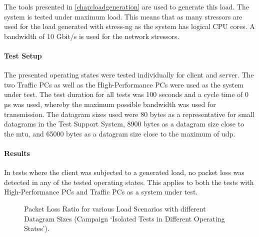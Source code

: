 The tools presented in \ref{chap:loadgeneration} are used to generate this load. The system is tested under maximum load. This means that as many stressors are used for the load generated with stress-ng as the system has logical \ac{CPU} cores. A bandwidth of 10 Gbit/s is used for the network stressors.

\paragraph{Test Setup}
The presented operating states were tested individually for client and server. The two Traffic PCs as well as the High-Performance PCs were used as the system under test. The test duration for all tests was 100 seconds and a cycle time of 0 µs was used, whereby the maximum possible bandwidth was used for transmission. The datagram sizes used were 80 bytes as a representative for small datagrams in the Test Support System, 8900 bytes as a datagram size close to the \ac{mtu}, and 65000 bytes as a datagram size close to the maximum of \ac{udp}.

\paragraph{Results}
In tests where the client was subjected to a generated load, no packet loss was detected in any of the tested operating states. This applies to both the tests with High-Performance PCs and Traffic PCs as a system under test.

\begin{figure}[h!]
  \centering
  \caption{Packet Loss Ratio for various Load Scenarios with different Datagram Sizes (Campaign `Isolated Tests in Different Operating States').}
  \label{fig:resuc1}
\end{figure}


